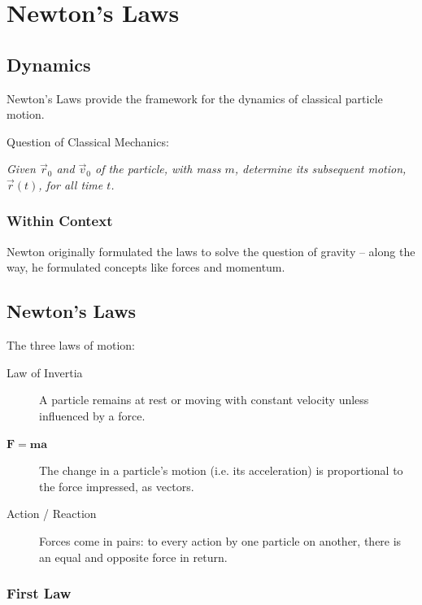 \chapter{Newton's Laws}

\section{Dynamics}

Newton's Laws provide the framework for the dynamics of classical particle motion.

Question of Classical Mechanics:

\begin{center}
	\textit{Given $\vec r_0$ and $\vec v_0$ of the particle, with mass $m$, determine its subsequent motion, $\vec r(t)$, for all time $t$.}
\end{center}

\subsection{Within Context}

Newton originally formulated the laws to solve the question of gravity -- along the way, he formulated concepts like forces and momentum.

\section{Newton's Laws}

\begin{definition}
	The three laws of motion:

	\begin{description}
		\item[Law of Invertia] A particle remains at rest or moving with constant velocity unless influenced by a force.
		\item[$\mathbf{F = m a}$] The change in a particle's motion (i.e. its acceleration) is proportional to the force impressed, as vectors. 
		\item[Action / Reaction] Forces come in pairs: to every action by one particle on another, there is an equal and opposite force in return. 
	\end{description}
\end{definition}

\subsection{First Law}

